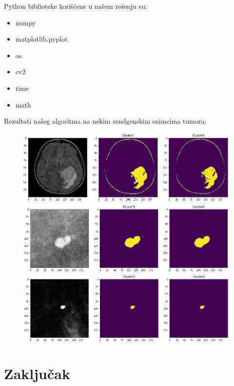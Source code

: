 \documentclass{article}
\begin{document}
{\selectfont Python} biblioteke kori\v{s}\'{c}ene u na\v{s}em re\v{s}enju su:
\selectfont
\begin{itemize}
\item numpy
\item matplotlib.pyplot
\item os
\item cv2
\item time
\item math
\end{itemize}
\selectfont

Rezultati na\v{s}eg algoritma na nekim rendgenskim snimcima tumora:

\newpage

\begin{figure}[h]
\centerline{\includegraphics[scale=0.45]{images/segmented0.png}}
\centerline{\includegraphics[scale=0.45]{images/segmented1.png}}
\centerline{\includegraphics[scale=0.45]{images/segmented2.png}}
\end{figure}


\section{\selectfont Zaklju\v{c}ak}
\end{document}
